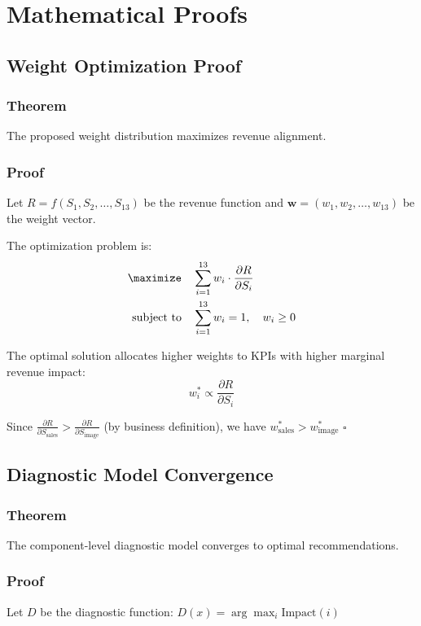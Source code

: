\documentclass[12pt,a4paper]{article}
\begin{document}
\section{Mathematical Proofs}

\subsection{Weight Optimization Proof}

\subsubsection{Theorem}
The proposed weight distribution maximizes revenue alignment.

\subsubsection{Proof}
Let $R = f(S_1, S_2, \ldots, S_{13})$ be the revenue function and $\mathbf{w} = (w_1, w_2, \ldots, w_{13})$ be the weight vector.

The optimization problem is:
\begin{align}
\maximize \quad &\sum_{i=1}^{13} w_i \cdot \frac{\partial R}{\partial S_i} \\
\text{subject to} \quad &\sum_{i=1}^{13} w_i = 1, \quad w_i \geq 0
\end{align}

The optimal solution allocates higher weights to KPIs with higher marginal revenue impact:
\begin{equation}
w_i^* \propto \frac{\partial R}{\partial S_i}
\end{equation}

Since $\frac{\partial R}{\partial S_{\text{sales}}} > \frac{\partial R}{\partial S_{\text{image}}}$ (by business definition), we have $w_{\text{sales}}^* > w_{\text{image}}^*$ $\square$

\subsection{Diagnostic Model Convergence}

\subsubsection{Theorem}
The component-level diagnostic model converges to optimal recommendations.

\subsubsection{Proof}
Let $D$ be the diagnostic function: $D(x) = \arg\max_i \text{Impact}(i)$
\end{document}
